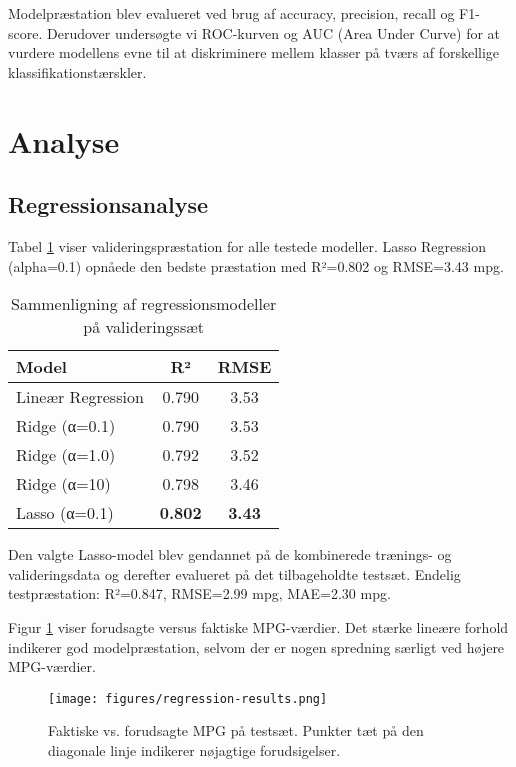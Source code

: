 \documentclass[a4paper, twocolumn]{article}
\begin{document}
Modelpræstation blev evalueret ved brug af accuracy, precision, recall og F1-score. Derudover undersøgte vi ROC-kurven og AUC (Area Under Curve) for at vurdere modellens evne til at diskriminere mellem klasser på tværs af forskellige klassifikationstærskler.

\section{Analyse}
\label{sec:analysis}

\subsection{Regressionsanalyse}
Tabel \ref{tab:regression} viser valideringspræstation for alle testede modeller. Lasso Regression (alpha=0.1) opnåede den bedste præstation med R²=0.802 og RMSE=3.43 mpg.

\begin{table}[h]
\centering
\caption{Sammenligning af regressionsmodeller på valideringssæt}
\label{tab:regression}
\begin{tabular}{lcc}
\toprule
Model & R² & RMSE \\
\midrule
Lineær Regression & 0.790 & 3.53 \\
Ridge (α=0.1) & 0.790 & 3.53 \\
Ridge (α=1.0) & 0.792 & 3.52 \\
Ridge (α=10) & 0.798 & 3.46 \\
Lasso (α=0.1) & \textbf{0.802} & \textbf{3.43} \\
\bottomrule
\end{tabular}
\end{table}

Den valgte Lasso-model blev gendannet på de kombinerede trænings- og valideringsdata og derefter evalueret på det tilbageholdte testsæt. Endelig testpræstation: R²=0.847, RMSE=2.99 mpg, MAE=2.30 mpg.

Figur \ref{fig:regression} viser forudsagte versus faktiske MPG-værdier. Det stærke lineære forhold indikerer god modelpræstation, selvom der er nogen spredning særligt ved højere MPG-værdier.

\begin{figure}[h]
    \centering
    \texttt{[image: figures/regression-results.png]}
    \caption{Faktiske vs. forudsagte MPG på testsæt. Punkter tæt på den diagonale linje indikerer nøjagtige forudsigelser.}
    \label{fig:regression}
\end{figure}
\end{document}
